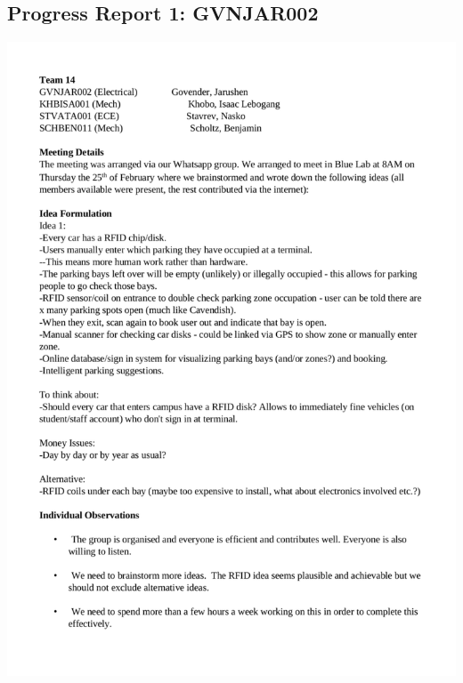 \subsection*{Progress Report 1: GVNJAR002}
\includegraphics[scale=0.8]{meeting/report1-jarushen.pdf}

\newpage
